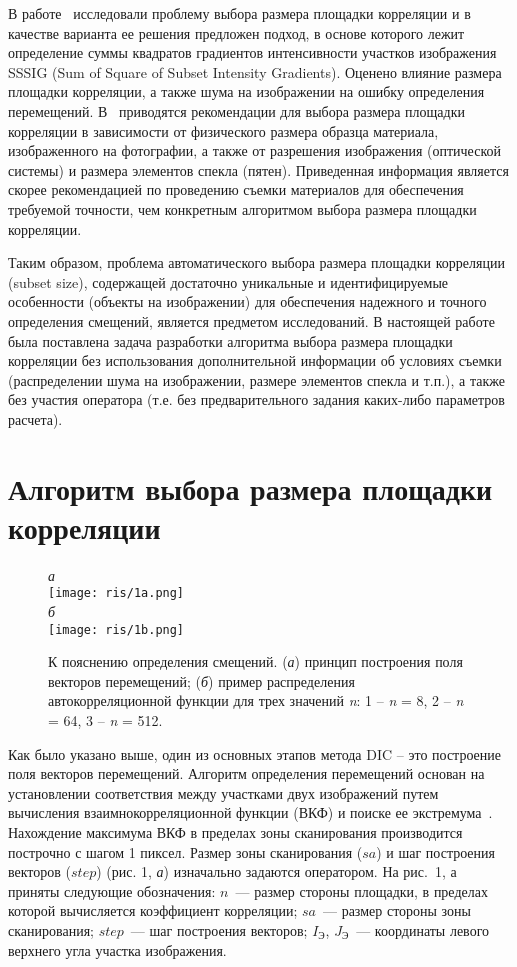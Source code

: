 \documentclass[a4paper]{jctart10}
\begin{document}
В работе~\cite{12} исследовали проблему выбора размера площадки корреляции и в качестве варианта ее решения предложен подход, в основе которого лежит определение суммы квадратов градиентов интенсивности участков изображения {SSSIG} (Sum of Square of Subset Intensity Gradients). Оценено влияние размера площадки корреляции, а также шума на изображении на ошибку определения перемещений. В~\cite{1} приводятся рекомендации для выбора размера площадки корреляции в зависимости от физического размера образца материала, изображенного на фотографии, а также от разрешения изображения (оптической системы) и размера элементов спекла (пятен). Приведенная информация является скорее рекомендацией по проведению съемки материалов для обеспечения требуемой точности, чем конкретным алгоритмом выбора размера площадки корреляции.

Таким образом, проблема автоматического выбора размера площадки корреляции (subset size), содержащей достаточно уникальные и идентифицируемые особенности (объекты на изображении) для обеспечения надежного и точного определения смещений, является предметом исследований. В настоящей работе была поставлена задача разработки алгоритма выбора размера площадки корреляции без использования дополнительной информации об условиях съемки (распределении шума на изображении, размере элементов спекла и т.п.), а также без участия оператора (т.е. без предварительного задания каких-либо параметров расчета).

\section{Алгоритм выбора размера площадки корреляции}
\begin{figure}[b!]
    \centering
		\small{\it а}\\
    \texttt{[image: ris/1a.png]}\\
		{\it б}\\
		\texttt{[image: ris/1b.png]}
    \caption{К пояснению определения смещений. ({\it а}) принцип построения поля векторов перемещений; ({\it б}) пример распределения автокорреляционной функции для трех значений {\it n}:
1 – {\it n} = 8, 2 – {\it n} = 64, 3 – {\it n} = 512.}
\end{figure}

Как было указано выше, один из основных этапов метода {DIC} -- это построение поля векторов перемещений. Алгоритм определения перемещений основан на установлении соответствия между участками двух изображений путем вычисления взаимнокорреляционной функции (ВКФ) и поиске ее экстремума~\cite{13}. Нахождение максимума ВКФ в пределах зоны сканирования производится построчно с шагом 1 пиксел. Размер зоны сканирования ($sa$) и шаг построения векторов ($step$) (рис. 1, {\it а}) изначально задаются оператором. На рис.~1, а приняты следующие обозначения: $n$~--- размер стороны площадки, в пределах которой вычисляется коэффициент корреляции; $sa$~--- размер стороны зоны сканирования; $step$~--- шаг построения векторов; $I_{Э}$, $J_{Э}$~--- координаты левого верхнего угла участка изображения.
\end{document}
